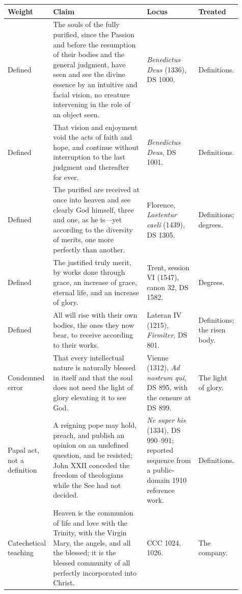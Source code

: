 \begingroup
\renewcommand{\arraystretch}{1.10}
\footnotesize
\begin{longtable}{>{\raggedright\arraybackslash}p{0.13\linewidth}>{\raggedright\arraybackslash}p{0.40\linewidth}>{\raggedright\arraybackslash}p{0.22\linewidth}>{\raggedright\arraybackslash}p{0.16\linewidth}}
\toprule
\textbf{Weight} & \textbf{Claim} & \textbf{Locus} & \textbf{Treated}\\
\midrule
\endhead
\bottomrule
\endfoot
Defined & The souls of the fully purified, since the Passion and before the resumption of their bodies and the general judgment, have seen and see the divine essence by an intuitive and facial vision, no creature intervening in the role of an object seen. & \emph{Benedictus Deus} (1336), DS 1000. & Definitions.\\
Defined & That vision and enjoyment void the acts of faith and hope, and continue without interruption to the last judgment and thereafter for ever. & \emph{Benedictus Deus}, DS 1001. & Definitions.\\
Defined & The purified are received at once into heaven and see clearly God himself, three and one, as he is---yet according to the diversity of merits, one more perfectly than another. & Florence, \emph{Laetentur caeli} (1439), DS 1305. & Definitions; degrees.\\
Defined & The justified truly merit, by works done through grace, an increase of grace, eternal life, and an increase of glory. & Trent, session VI (1547), canon 32, DS 1582. & Degrees.\\
Defined & All will rise with their own bodies, the ones they now bear, to receive according to their works. & Lateran IV (1215), \emph{Firmiter}, DS 801. & Definitions; the risen body.\\
Condemned error & That every intellectual nature is naturally blessed in itself and that the soul does not need the light of glory elevating it to see God. & Vienne (1312), \emph{Ad nostrum qui}, DS 895, with the censure at DS 899. & The light of glory.\\
Papal act, not a definition & A reigning pope may hold, preach, and publish an opinion on an undefined question, and be resisted; John XXII conceded the freedom of theologians while the See had not decided. & \emph{Ne super his} (1334), DS 990--991; reported sequence from a public-domain 1910 reference work. & Definitions.\\
Catechetical teaching & Heaven is the communion of life and love with the Trinity, with the Virgin Mary, the angels, and all the blessed; it is the blessed community of all perfectly incorporated into Christ. & CCC 1024, 1026. & The company.\\

\end{longtable}
